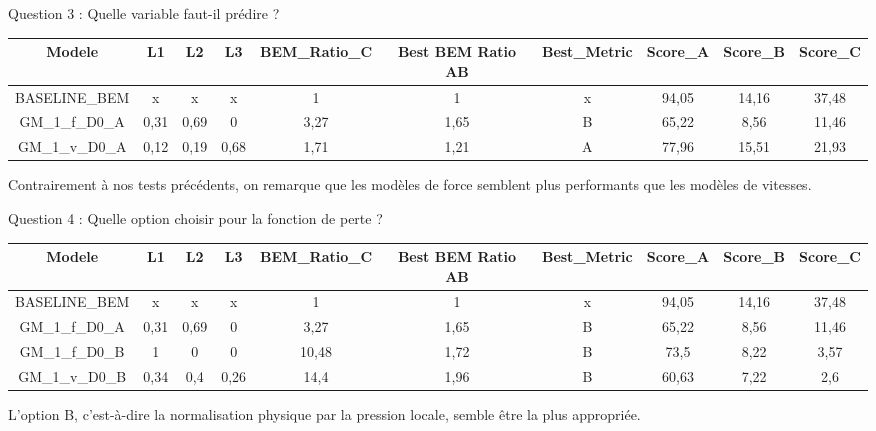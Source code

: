\documentclass[
11pt,notheorems,hyperref={pdfauthor=whatever}
]{beamer}
\begin{document}
\begin{frame}{Question 3 : Quelle variable faut-il prédire ?}
     
        \begin{center}
            \tiny
             \begin{tabular}{|c|c|c|c|c|c|c|c|c|c|}
                \hline
                Modele & L1 & L2 & L3 & BEM\_Ratio\_C & Best BEM Ratio AB & Best\_Metric & Score\_A & Score\_B & Score\_C   \\
                \hline
                BASELINE\_BEM    & x     & x    & x & 1 & 1 & x & 94,05 & 14,16 & 37,48                               \\
                GM\_1\_f\_D0\_A  & 0,31  & 0,69 & 0 &3,27 & 1,65& B    &  65,22 & 8,56  & 11,46                       \\
                GM\_1\_v\_D0\_A  &  0,12 & 0,19 & 0,68 & 1,71 & 1,21 & A & 77,96 & 15,51 & 21,93                      \\
                \hline
            \end{tabular}
        \end{center}

        \vspace{0.3cm}
        
        Contrairement à nos tests précédents, on remarque que les modèles de force semblent plus performants que les modèles de vitesses.
\end{frame}

\begin{frame}{Question 4 : Quelle option choisir pour la fonction de perte ?}

    \begin{center}
        \tiny
        \begin{tabular}{|c|c|c|c|c|c|c|c|c|c|}
                \hline
                Modele & L1 & L2 & L3 & BEM\_Ratio\_C & Best BEM Ratio AB & Best\_Metric & Score\_A & Score\_B & Score\_C   \\
                \hline
                BASELINE\_BEM    & x     & x    & x   &  1   & 1     & x    & 94,05  & 14,16 & 37,48       \\
                GM\_1\_f\_D0\_A  & 0,31  & 0,69 & 0   &3,27  & 1,65  & B    & 65,22  & 8,56  & 11,46       \\
                GM\_1\_f\_D0\_B  & 1     & 0    & 0   &10,48 & 1,72  & B    & 73,5   & 8,22  & 3,57        \\
                GM\_1\_v\_D0\_B  & 0,34	 & 0,4	& 0,26&14,4	 & 1,96  & B    & 60,63	 &7,22	 & 2,6         \\
                \hline
        \end{tabular}
    \end{center}
    L'option B, c'est-à-dire la normalisation physique par la pression locale, semble être la plus appropriée.
\end{frame}
\end{document}
